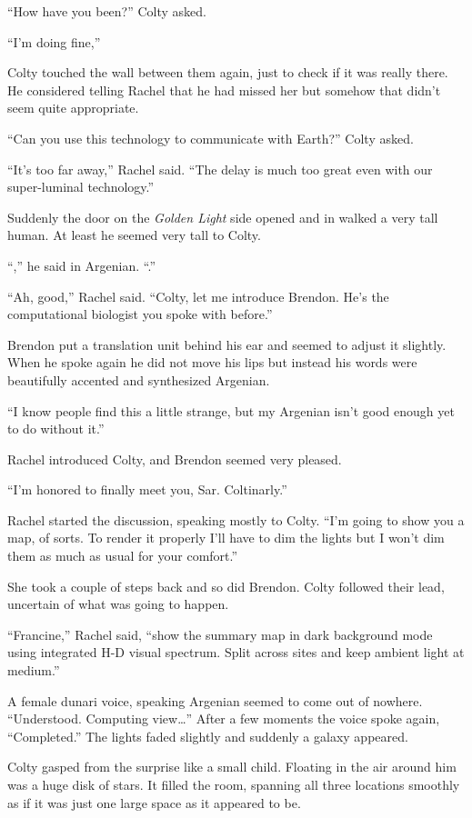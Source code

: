 ``How have you been?'' Colty asked.

``I'm doing fine,''

Colty touched the wall between them again, just to check if it was really there. He considered
telling Rachel that he had missed her but somehow that didn't seem quite appropriate.

``Can you use this technology to communicate with Earth?'' Colty asked.

``It's too far away,'' Rachel said. ``The delay is much too great even with our super-luminal
technology.''

Suddenly the door on the \textit{Golden Light} side opened and in walked a very tall human. At
least he seemed very tall to Colty.

``,'' he said in Argenian. ``.''

``Ah, good,'' Rachel said. ``Colty, let me introduce Brendon. He's the computational biologist
you spoke with before.''

Brendon put a translation unit behind his ear and seemed to adjust it slightly. When he spoke
again he did not move his lips but instead his words were beautifully accented and synthesized
Argenian.

``I know people find this a little strange, but my Argenian isn't good enough yet to do without
it.''

Rachel introduced Colty, and Brendon seemed very pleased.

``I'm honored to finally meet you, Sar. Coltinarly.''

Rachel started the discussion, speaking mostly to Colty. ``I'm going to show you a map, of
sorts. To render it properly I'll have to dim the lights but I won't dim them as much as usual
for your comfort.''

She took a couple of steps back and so did Brendon. Colty followed their lead, uncertain of what
was going to happen.

``Francine,'' Rachel said, ``show the summary map in dark background mode using integrated H-D
visual spectrum. Split across sites and keep ambient light at medium.''

A female dunari voice, speaking Argenian seemed to come out of nowhere. ``Understood. Computing
view\ldots'' After a few moments the voice spoke again, ``Completed.'' The lights faded slightly
and suddenly a galaxy appeared.

Colty gasped from the surprise like a small child. Floating in the air around him was a huge
disk of stars. It filled the room, spanning all three locations smoothly as if it was just one
large space as it appeared to be.

